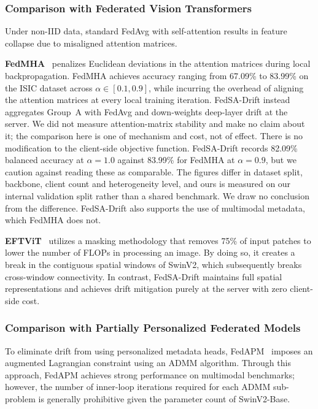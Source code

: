 \documentclass{ieeeaccess}
\newcommand{\sadrift}{FedSA-Drift}
\begin{document}
\subsubsection{Comparison with Federated Vision Transformers}

Under non-IID data, standard FedAvg with self-attention results in feature collapse due to misaligned attention matrices.

\textbf{FedMHA}~\cite{Darzi2024} penalizes Euclidean deviations in the attention matrices during local backpropagation. FedMHA achieves accuracy ranging from 67.09\% to 83.99\% on the ISIC dataset across $\alpha \in [0.1, 0.9]$, while incurring the overhead of aligning the attention matrices at every local training iteration. \sadrift{} instead aggregates Group~A with FedAvg and down-weights deep-layer drift at the server. We did not measure attention-matrix stability and make no claim about it; the comparison here is one of mechanism and cost, not of effect. There is no modification to the client-side objective function. \sadrift{} records 82.09\% balanced accuracy at $\alpha = 1.0$ against 83.99\% for FedMHA at $\alpha = 0.9$, but we caution against reading these as comparable. The figures differ in dataset split, backbone, client count and heterogeneity level, and ours is measured on our internal validation split rather than a shared benchmark. We draw no conclusion from the difference. \sadrift{} also supports the use of multimodal metadata, which FedMHA does not.

\textbf{EFTViT}~\cite{Wu2024} utilizes a masking methodology that removes 75\% of input patches to lower the number of FLOPs in processing an image. By doing so, it creates a break in the contiguous spatial windows of SwinV2, which subsequently breaks cross-window connectivity. In contrast, \sadrift{} maintains full spatial representations and achieves drift mitigation purely at the server with zero client-side cost.

\subsubsection{Comparison with Partially Personalized Federated Models}

To eliminate drift from using personalized metadata heads, FedAPM~\cite{Zhu2025} imposes an augmented Lagrangian constraint using an ADMM algorithm. Through this approach, FedAPM achieves strong performance on multimodal benchmarks; however, the number of inner-loop iterations required for each ADMM sub-problem is generally prohibitive given the parameter count of SwinV2-Base.
\end{document}
